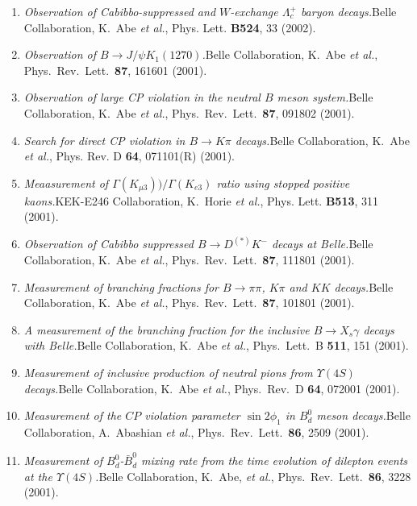 \documentclass[10pt,a4paper]{article}
\def\pub#1#2#3{{\it #1.}\newline #2, #3.}
\def\cited#1{Cited $\ge$ #1}
\def\PLB#1{Phys. Lett. {\bf B#1}}
\def\PRL{Phys.\ Rev.\ Lett.\ }
\def\etal{{\it et al.}}
\def\belle{Belle Collaboration, K.~Abe \etal }
\begin{document}
\begin{enumerate}
\item
\pub{Observation of Cabibbo-suppressed and $W$-exchange
$\Lambda_c^+$ baryon decays}
{\belle}
{\PLB{524}, 33 (2002)}  %


\item
\pub{Observation of $B \to J/\psi K_1(1270)$}
{\belle}
{\PRL {\bf 87}, 161601 (2001)}

\item
\pub{Observation of large CP violation in the neutral $B$ meson system}
{\belle}
{\PRL  {\bf 87}, 091802 (2001)}

\item
\pub{Search for direct CP violation in $B \to K \pi$ decays}
{\belle}
{Phys. Rev. D {\bf 64}, 071101(R) (2001)}

\item
\pub{Meaasurement of $\Gamma(K_{\mu3}))/\Gamma(K_{e3})$ ratio using
stopped positive  kaons} 
{KEK-E246 Collaboration, K.~Horie \etal}
{\PLB {513}, 311 (2001)}

\item
\pub{Observation of Cabibbo suppressed $B \to D^{(*)} K^-$ decays at Belle}
{\belle}
{Phys.\ Rev.\ Lett.\  {\bf 87}, 111801 (2001)}

\item
\pub{Measurement of branching fractions for $B \to \pi \pi$, $K \pi$ and
$K K$  decays}
{\belle}
{Phys.\ Rev.\ Lett.\  {\bf 87}, 101801 (2001)}

\item
\pub{A measurement of the branching fraction for the inclusive $B
\to X_s  \gamma$ decays with Belle}
{\belle}
{Phys.\ Lett.\ B {\bf 511}, 151 (2001)}

\item
\pub{Measurement of inclusive production of neutral pions from
$\Upsilon(4S)$ decays}
{\belle}
{Phys.\ Rev.\ D {\bf 64}, 072001 (2001)}

\item
\pub{Measurement of the $CP$ violation parameter $\sin 2\phi_1$ in
$B_d^0$ meson decays} 
{Belle Collaboration, A.~Abashian \etal}
{Phys.\ Rev.\ Lett.\  {\bf 86}, 2509 (2001)}

\item 
\pub{Measurement of $B^0_d$-$\bar B^0_d$ mixing rate from the
time evolution of dilepton events at the $\Upsilon(4S)$} 
{Belle Collaboration, K.~Abe, \etal}
{Phys.\ Rev.\ Lett.\  {\bf 86}, 3228 (2001)}



\end{enumerate}
\end{document}
